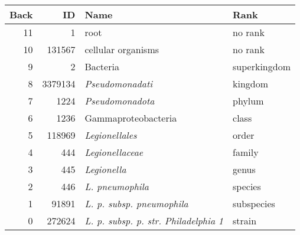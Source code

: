 \begin{tabular}{rrll}
  \hline
Back & ID &      Name &                                                           Rank\\\hline
  11 &    1 &        root &                                                           no rank\\
  10 &    131567 &   cellular organisms &                                             no rank\\
  9 &     2       & Bacteria &                                                       superkingdom\\
  8 &     3379134 &  \emph{Pseudomonadati} &                                                 kingdom\\
  7 &     1224 &     \emph{Pseudomonadota} &                                                 phylum\\
  6 &     1236 &     Gammaproteobacteria &                                            class\\
  5 &     118969 &   \emph{Legionellales} &                                                  order\\
  4 &     444 &      \emph{Legionellaceae} &                                                 family\\
  3 &     445 &      \emph{Legionella} &                                                     genus\\
  2 &     446 &      \emph{L. pneumophila} &                                         species\\
  1 &     91891 &    \emph{L. p. subsp. pneumophila} &                      subspecies\\
  0 &     272624 &   \emph{L. p. subsp. p. str. Philadelphia 1} &  strain\\\hline
\end{tabular}
